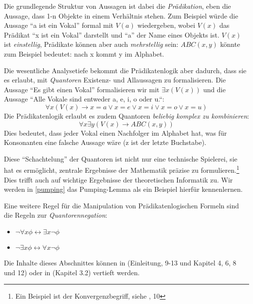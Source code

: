 Die grundlegende Struktur von Aussagen ist dabei die \emph{Prädikation},
eben die Aussage, dass 1-n Objekte in einem Verhältnis stehen.
Zum Beispiel würde die Aussage
``a ist ein Vokal'' formal mit $V(a)$ wiedergeben,
wobei $V(x)$ das Prädikat ``x ist ein Vokal'' darstellt
und ``a'' der Name eines Objekts ist.
$V(x)$ ist \emph{einstellig},
Prädikate können aber auch \emph{mehrstellig} sein:
$ABC(x,y)$ könnte zum Beispiel bedeutet: nach x kommt y im Alphabet.

Die wesentliche Analysetiefe bekommt die Prädikatenlogik aber dadurch,
dass sie es erlaubt, mit \emph{Quantoren} Existenz- und Allaussagen zu formalisieren.
Die Aussage ``Es gibt einen Vokal'' formalisieren wir mit $\exists x(V(x))$
und die Aussage ``Alle Vokale sind entweder a, e, i, o oder u.``:
\[\forall x (V(x) \rightarrow x = a \vee x = e \vee x = i \vee x = o \vee x = u)\]
Die Prädikatenlogik erlaubt es zudem Quantoren \emph{beliebig komplex zu kombinieren}:
\[\forall x \exists y(V(x) \rightarrow ABC(x,y))\]
Dies bedeutet, dass jeder Vokal einen Nachfolger im Alphabet hat,
was für Konsonanten eine falsche Aussage wäre (z ist der letzte Buchstabe).

Diese ``Schachtelung'' der Quantoren ist nicht nur eine technische Spielerei,
sie hat es ermöglicht, zentrale Ergebnisse der Mathematik präzise zu formulieren.\footnote{
    Ein Beispiel ist der Konvergenzbegriff, siehe \cite{link}, 10
}
Dies trifft auch auf wichtige Ergebnisse der theoretischen Informatik zu.
Wir werden in \autoref{pumping} das Pumping-Lemma als ein Beispiel hierfür kennenlernen.

Eine weitere Regel für die Manipulation von Prädikatenlogischen Formeln
sind die Regeln zur \emph{Quantorennegation}:
\begin{itemize}
    \item $\neg \forall x \phi \leftrightarrow \exists x \neg \phi$
    \item $\neg \exists x \phi \leftrightarrow \forall x \neg \phi$
\end{itemize}

Die Inhalte dieses Abschnittes können in \cite{link}
(Einleitung, 9-13 und Kapitel 4, 6, 8 und 12)
oder in \cite{hoffmann} (Kapitel 3.2)
vertieft werden.



